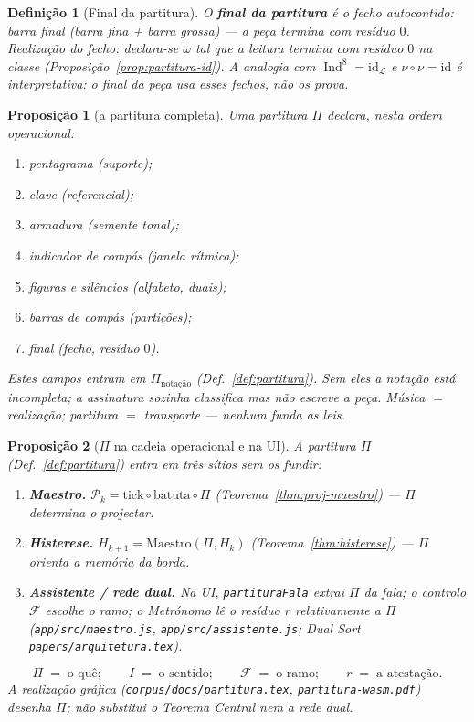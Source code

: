 \documentclass[11pt,a4paper]{article}
\newtheorem{definicao}{Definição}
\newtheorem{proposicao}{Proposição}
\newcommand{\code}[1]{\texttt{#1}}
\begin{document}
\begin{definicao}[Final da partitura]\label{def:final}
O \textbf{final da partitura} é o fecho autocontido: barra final
(barra fina + barra grossa) --- a peça termina com resíduo $0$.
\emph{Realização do fecho:} declara-se $\omega$ tal que a leitura
termina com resíduo $0$ na classe (Proposição~\ref{prop:partitura-id}).
A analogia com $\operatorname{Ind}^{8}=\mathrm{id}_{\mathcal L}$ e
$\nu\circ\nu=\mathrm{id}$ é interpretativa: o final da peça
\emph{usa} esses fechos, não os prova.
\end{definicao}

\begin{proposicao}[a partitura completa]\label{prop:partitura-completa}
Uma partitura $\Pi$ declara, nesta ordem operacional:
\begin{enumerate}
\item pentagrama (suporte);
\item clave (referencial);
\item armadura (semente tonal);
\item indicador de compás (janela rítmica);
\item figuras e silêncios (alfabeto, duais);
\item barras de compás (partições);
\item final (fecho, resíduo $0$).
\end{enumerate}
Estes campos entram em $\Pi_{\mathrm{notação}}$
(Def.~\ref{def:partitura}). Sem eles a notação está incompleta;
a assinatura sozinha classifica mas não escreve a peça. Música $=$
realização; partitura $=$ transporte --- nenhum funda as leis.
\end{proposicao}

\begin{proposicao}[$\Pi$ na cadeia operacional e na UI]\label{prop:pi-cadeia}
A partitura $\Pi$ (Def.~\ref{def:partitura}) entra em três sítios sem
os fundir:
\begin{enumerate}
\item \textbf{Maestro.}
$\mathcal{P}_k=\mathrm{tick}\circ\mathrm{batuta}\circ\Pi$
(Teorema~\ref{thm:proj-maestro}) --- $\Pi$ determina o projectar.
\item \textbf{Histerese.} $H_{k+1}=\mathrm{Maestro}(\Pi,H_k)$
(Teorema~\ref{thm:histerese}) --- $\Pi$ orienta a memória da borda.
\item \textbf{Assistente / rede dual.} Na UI,
\code{partituraFala} extrai $\Pi$ da fala; o controlo
$\mathcal{F}$ escolhe o ramo; o Metrónomo lê o resíduo $r$
relativamente a $\Pi$ (\code{app/src/maestro.js},
\code{app/src/assistente.js}; Dual Sort
\code{papers/arquitetura.tex}).
\end{enumerate}
\[
\boxed{
\Pi
\;=\;
\text{o quê};
\qquad
I
\;=\;
\text{o sentido};
\qquad
\mathcal{F}
\;=\;
\text{o ramo};
\qquad
r
\;=\;
\text{a atestação}.
}
\]
A realização gráfica (\code{corpus/docs/partitura.tex},
\code{partitura-wasm.pdf}) desenha $\Pi$; não substitui o Teorema
Central nem a rede dual.
\end{proposicao}
\end{document}
